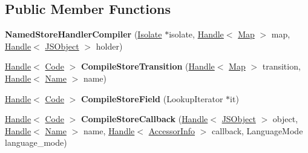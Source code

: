 \subsection*{Public Member Functions}
\begin{DoxyCompactItemize}
\item 
{\bfseries Named\+Store\+Handler\+Compiler} (\hyperlink{classv8_1_1internal_1_1_isolate}{Isolate} $\ast$isolate, \hyperlink{classv8_1_1internal_1_1_handle}{Handle}$<$ \hyperlink{classv8_1_1internal_1_1_map}{Map} $>$ map, \hyperlink{classv8_1_1internal_1_1_handle}{Handle}$<$ \hyperlink{classv8_1_1internal_1_1_j_s_object}{J\+S\+Object} $>$ holder)\hypertarget{classv8_1_1internal_1_1_named_store_handler_compiler_af08a1b413eceec07af6cf657634c890b}{}\label{classv8_1_1internal_1_1_named_store_handler_compiler_af08a1b413eceec07af6cf657634c890b}

\item 
\hyperlink{classv8_1_1internal_1_1_handle}{Handle}$<$ \hyperlink{classv8_1_1internal_1_1_code}{Code} $>$ {\bfseries Compile\+Store\+Transition} (\hyperlink{classv8_1_1internal_1_1_handle}{Handle}$<$ \hyperlink{classv8_1_1internal_1_1_map}{Map} $>$ transition, \hyperlink{classv8_1_1internal_1_1_handle}{Handle}$<$ \hyperlink{classv8_1_1internal_1_1_name}{Name} $>$ name)\hypertarget{classv8_1_1internal_1_1_named_store_handler_compiler_aff4a326e1e65e69277575554a7daf7e6}{}\label{classv8_1_1internal_1_1_named_store_handler_compiler_aff4a326e1e65e69277575554a7daf7e6}

\item 
\hyperlink{classv8_1_1internal_1_1_handle}{Handle}$<$ \hyperlink{classv8_1_1internal_1_1_code}{Code} $>$ {\bfseries Compile\+Store\+Field} (Lookup\+Iterator $\ast$it)\hypertarget{classv8_1_1internal_1_1_named_store_handler_compiler_a6cd53fde6a680cb87b838257fd63b8cc}{}\label{classv8_1_1internal_1_1_named_store_handler_compiler_a6cd53fde6a680cb87b838257fd63b8cc}

\item 
\hyperlink{classv8_1_1internal_1_1_handle}{Handle}$<$ \hyperlink{classv8_1_1internal_1_1_code}{Code} $>$ {\bfseries Compile\+Store\+Callback} (\hyperlink{classv8_1_1internal_1_1_handle}{Handle}$<$ \hyperlink{classv8_1_1internal_1_1_j_s_object}{J\+S\+Object} $>$ object, \hyperlink{classv8_1_1internal_1_1_handle}{Handle}$<$ \hyperlink{classv8_1_1internal_1_1_name}{Name} $>$ name, \hyperlink{classv8_1_1internal_1_1_handle}{Handle}$<$ \hyperlink{classv8_1_1internal_1_1_accessor_info}{Accessor\+Info} $>$ callback, Language\+Mode language\+\_\+mode)\hypertarget{classv8_1_1internal_1_1_named_store_handler_compiler_ae87185b3947ad773f71eff333d16d514}{}\label{classv8_1_1internal_1_1_named_store_handler_compiler_ae87185b3947ad773f71eff333d16d514}


\end{DoxyCompactItemize}
